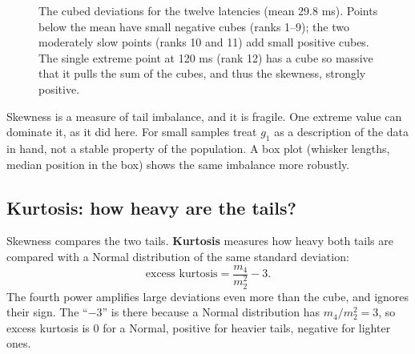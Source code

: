\begin{figure}[H]
\centering
{}
\caption{The cubed deviations for the twelve latencies (mean 29.8 ms). Points below the mean have small negative cubes (ranks 1--9); the two moderately slow points (ranks 10 and 11) add small positive cubes. The single extreme point at 120 ms (rank 12) has a cube so massive that it pulls the sum of the cubes, and thus the skewness, strongly positive.}
\label{fig:quantiles-cubes}
\end{figure}


\begin{intuitionbox}
Skewness is a measure of tail imbalance, and it is fragile. One extreme value can
dominate it, as it did here. For small samples treat $g_1$ as a description of the data
in hand, not a stable property of the population. A box plot (whisker lengths, median
position in the box) shows the same imbalance more robustly.
\end{intuitionbox}

\subsection{Kurtosis: how heavy are the tails?}

Skewness compares the two tails. \textbf{Kurtosis} measures how heavy both tails are
compared with a Normal distribution of the same standard deviation:
\[
  \text{excess kurtosis} = \frac{m_4}{m_2^2} - 3 .
\]
The fourth power amplifies large deviations even more than the cube, and ignores their
sign. The ``$-3$'' is there because a Normal distribution has $m_4/m_2^2 = 3$, so excess
kurtosis is $0$ for a Normal, positive for heavier tails, negative for lighter ones.

